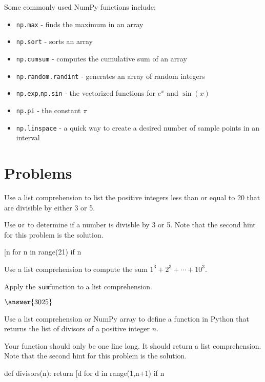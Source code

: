 \documentclass{ximera}
\begin{document}
Some commonly used NumPy functions include:

\begin{itemize}
	\item \verb|np.max| - finds the maximum in an array
	\item \verb|np.sort| - sorts an array
	\item \verb|np.cumsum| - computes the cumulative sum of an array
	\item \verb|np.random.randint| - generates an array of random integers
	\item \verb|np.exp|,\verb|np.sin| - the vectorized functions for $e^x$ and $\sin(x)$
	\item \verb|np.pi| - the constant $\pi$
	\item \verb|np.linspace| - a quick way to create a desired number of sample points in an interval
\end{itemize}

\section{Problems}

\begin{question}
Use a list comprehension to list the positive integers less than or equal to 20 that are divisible by either 3 or 5.
	\begin{hint}
	Use \verb|or| to determine if a number is divisble by 3 or 5. Note that the second hint for this problem is the solution.
	\end{hint}
	\begin{hint}
\begin{sageCell}
	[n for n in range(21) if n%
\end{sageCell}
	\end{hint}
\end{question}

\begin{question}
Use a list comprehension to compute the sum $1^3+2^3+\cdots+10^3.$
	\begin{hint}
	Apply the \verb|sum|function to a list comprehension.
	\end{hint}
        $\answer{3025}$
\end{question}

\begin{question}
Use a list comprehension or NumPy array to define a function in Python that returns the list of divisors of a positive integer $n$.
	\begin{hint}
	Your function should only be one line long. It should return a list comprehension. Note that the second hint for this problem is the solution.
	\end{hint}
	\begin{hint}
\begin{sageCell}
def divisors(n):
        return [d for d in range(1,n+1) if n%
\end{sageCell}
	\end{hint}
\end{question}
\end{document}
